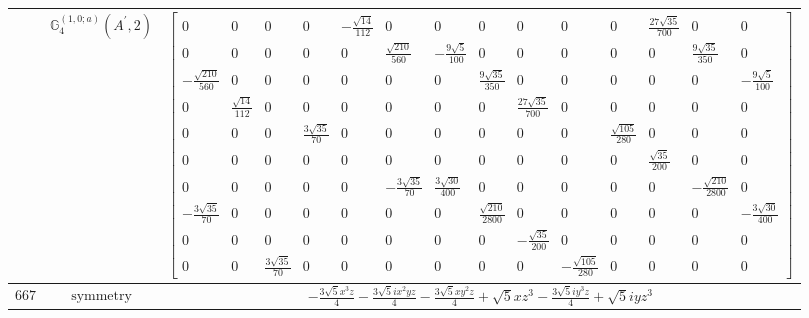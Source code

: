 \documentclass[fleqn,8pt,landscape]{jsarticle}
\begin{document}
\begin{longtable}{ccc}
$  $ & $ \mathbb{G}_{4}^{(1,0;a)}(A^{\prime},2) $ & $ \begin{bmatrix} 0 & 0 & 0 & 0 & - \frac{\sqrt{14}}{112} & 0 & 0 & 0 & 0 & 0 & 0 & \frac{27 \sqrt{35}}{700} & 0 & 0 \\ 0 & 0 & 0 & 0 & 0 & \frac{\sqrt{210}}{560} & - \frac{9 \sqrt{5}}{100} & 0 & 0 & 0 & 0 & 0 & \frac{9 \sqrt{35}}{350} & 0 \\ - \frac{\sqrt{210}}{560} & 0 & 0 & 0 & 0 & 0 & 0 & \frac{9 \sqrt{35}}{350} & 0 & 0 & 0 & 0 & 0 & - \frac{9 \sqrt{5}}{100} \\ 0 & \frac{\sqrt{14}}{112} & 0 & 0 & 0 & 0 & 0 & 0 & \frac{27 \sqrt{35}}{700} & 0 & 0 & 0 & 0 & 0 \\ 0 & 0 & 0 & \frac{3 \sqrt{35}}{70} & 0 & 0 & 0 & 0 & 0 & 0 & \frac{\sqrt{105}}{280} & 0 & 0 & 0 \\ 0 & 0 & 0 & 0 & 0 & 0 & 0 & 0 & 0 & 0 & 0 & \frac{\sqrt{35}}{200} & 0 & 0 \\ 0 & 0 & 0 & 0 & 0 & - \frac{3 \sqrt{35}}{70} & \frac{3 \sqrt{30}}{400} & 0 & 0 & 0 & 0 & 0 & - \frac{\sqrt{210}}{2800} & 0 \\ - \frac{3 \sqrt{35}}{70} & 0 & 0 & 0 & 0 & 0 & 0 & \frac{\sqrt{210}}{2800} & 0 & 0 & 0 & 0 & 0 & - \frac{3 \sqrt{30}}{400} \\ 0 & 0 & 0 & 0 & 0 & 0 & 0 & 0 & - \frac{\sqrt{35}}{200} & 0 & 0 & 0 & 0 & 0 \\ 0 & 0 & \frac{3 \sqrt{35}}{70} & 0 & 0 & 0 & 0 & 0 & 0 & - \frac{\sqrt{105}}{280} & 0 & 0 & 0 & 0 \end{bmatrix} $ \\ \hline
$ 667 $ & $ \text{symmetry} $ & $ - \frac{3 \sqrt{5} x^{3} z}{4} - \frac{3 \sqrt{5} i x^{2} y z}{4} - \frac{3 \sqrt{5} x y^{2} z}{4} + \sqrt{5} x z^{3} - \frac{3 \sqrt{5} i y^{3} z}{4} + \sqrt{5} i y z^{3} $ \\

\end{longtable}
\end{document}
